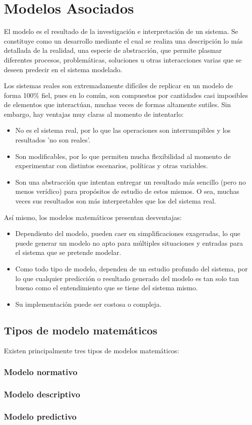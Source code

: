 \section{Modelos Asociados}

El modelo es el resultado de la investigación e interpretación de un sistema. Se constituye como un desarrollo mediante el cual se realiza una descripción lo más detallada de la realidad, una especie de abstracción, que permite plasmar diferentes procesos, problemáticas, soluciones u otras interacciones varias que se deseen predecir en el sistema modelado.

Los sistemas reales son extremadamente difíciles de replicar en un modelo de forma 100\% fiel, pues en lo común, son compuestos por cantidades casi imposibles de elementos que interactúan, muchas veces de formas altamente sutiles. Sin embargo, hay ventajas muy claras al momento de intentarlo:

\begin{itemize}
    \item No es el sistema real, por lo que las operaciones son interrumpibles y los resultados 'no son reales'.
    \item Son modificables, por lo que permiten mucha flexibilidad al momento de experimentar con distintos escenarios, políticas y otras variables.
    \item Son una abstracción que intentan entregar un resultado más sencillo (pero no menos verídico) para propósitos de estudio de estos mismos. O sea, muchas veces sus resultados son más interpretables que los del sistema real.
\end{itemize}

Así mismo, los modelos matemáticos presentan desventajas:

\begin{itemize}
    \item Dependiento del modelo, pueden caer en simplificaciones exageradas, lo que puede generar un modelo no apto para múltiples situaciones y entradas para el sistema que se pretende modelar.
    \item Como todo tipo de modelo, dependen de un estudio profundo del sistema, por lo que cualquier predicción o resultado generado del modelo es tan solo tan bueno como el entendimiento que se tiene del sistema mismo.
    \item Su implementación puede ser costosa o compleja.
\end{itemize}

\subsection*{Tipos de modelo matemáticos}
Existen principalmente tres tipos de modelos matemáticos:

\subsubsection{Modelo normativo}
\subsubsection{Modelo descriptivo}
\subsubsection{Modelo predictivo}